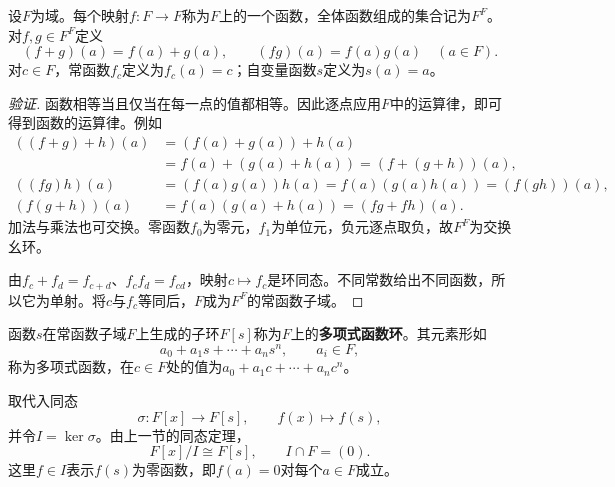\begin{definition}
设$F$为域。每个映射$f:F\to F$称为$F$上的一个函数，全体函数组成的集合记为$F^F$。对$f,g\in F^F$定义
\[
(f+g)(a)=f(a)+g(a),\qquad(fg)(a)=f(a)g(a)\quad(a\in F).
\]
对$c\in F$，常函数$f_c$定义为$f_c(a)=c$；自变量函数$s$定义为$s(a)=a$。
\end{definition}
\begin{proof}[验证]
函数相等当且仅当在每一点的值都相等。因此逐点应用$F$中的运算律，即可得到函数的运算律。例如
\begin{align*}
((f+g)+h)(a)&=(f(a)+g(a))+h(a)\\
&=f(a)+(g(a)+h(a))=(f+(g+h))(a),\\
((fg)h)(a)&=(f(a)g(a))h(a)=f(a)(g(a)h(a))=(f(gh))(a),\\
(f(g+h))(a)&=f(a)(g(a)+h(a))=(fg+fh)(a).
\end{align*}
加法与乘法也可交换。零函数$f_0$为零元，$f_1$为单位元，负元逐点取负，故$F^F$为交换幺环。

由$f_c+f_d=f_{c+d}$、$f_cf_d=f_{cd}$，映射$c\mapsto f_c$是环同态。不同常数给出不同函数，所以它为单射。将$c$与$f_c$等同后，$F$成为$F^F$的常函数子域。
\end{proof}

\begin{definition}
函数$s$在常函数子域$F$上生成的子环$F[s]$称为$F$上的\textbf{多项式函数环}。其元素形如
\[
a_0+a_1s+\cdots+a_ns^n,\qquad a_i\in F,
\]
称为多项式函数，在$c\in F$处的值为$a_0+a_1c+\cdots+a_nc^n$。
\end{definition}

取代入同态
\[
\sigma:F[x]\to F[s],\qquad f(x)\mapsto f(s),
\]
并令$I=\ker\sigma$。由上一节的同态定理，
\[
F[x]/I\cong F[s],\qquad I\cap F=(0).
\]
这里$f\in I$表示$f(s)$为零函数，即$f(a)=0$对每个$a\in F$成立。

